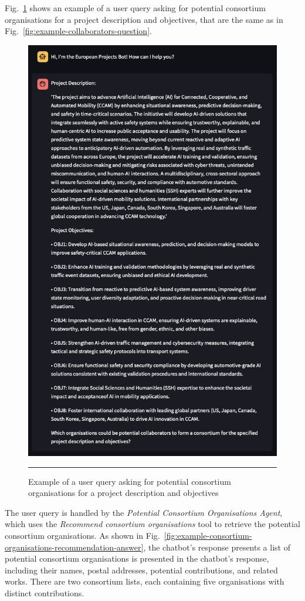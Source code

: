 Fig.~\ref{fig:example-consortium-organisations-recommendation-question} shows an example of a user query asking for potential consortium organisations for a project description and objectives, that are the same as in Fig.~\ref{fig:example-collaborators-question}.

\begin{figure}[htbp]
    \centering
 \includegraphics[width=.4\textwidth]{figures/implementation/example-consortium-organisations-recommendation-question.png}
     \rule{35em}{0.5pt}
    \caption{Example of a user query asking for potential consortium organisations for a project description and objectives}
 \label{fig:example-consortium-organisations-recommendation-question}
\end{figure}

The user query is handled by the \textit{Potential Consortium Organisations Agent}, which uses the \textit{Recommend consortium organisations} tool to retrieve the potential consortium organisations.
As shown in Fig.~\ref{fig:example-consortium-organisations-recommendation-answer}, the chatbot's response presents a list of potential consortium organisations is presented in the chatbot's response, including their names, postal addresses, potential contributions, and related works.
There are two consortium lists, each containing five organisations with distinct contributions.

